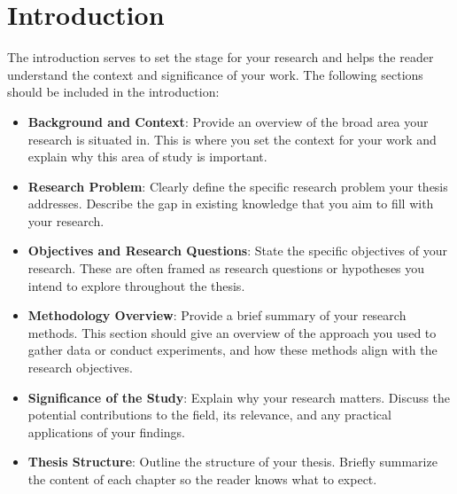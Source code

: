 \chapter{Introduction}

The introduction serves to set the stage for your research and helps the reader understand the context and significance of your work. The following sections should be included in the introduction:


\begin{itemize}
    \item \textbf{Background and Context}: Provide an overview of the broad area your research is situated in. This is where you set the context for your work and explain why this area of study is important.
    
    \item \textbf{Research Problem}: Clearly define the specific research problem your thesis addresses. Describe the gap in existing knowledge that you aim to fill with your research.
    
    \item \textbf{Objectives and Research Questions}: State the specific objectives of your research. These are often framed as research questions or hypotheses you intend to explore throughout the thesis.
    
    \item \textbf{Methodology Overview}: Provide a brief summary of your research methods. This section should give an overview of the approach you used to gather data or conduct experiments, and how these methods align with the research objectives.
    
    \item \textbf{Significance of the Study}: Explain why your research matters. Discuss the potential contributions to the field, its relevance, and any practical applications of your findings.
    
    \item \textbf{Thesis Structure}: Outline the structure of your thesis. Briefly summarize the content of each chapter so the reader knows what to expect.
\end{itemize}



\lipsum[2-7]